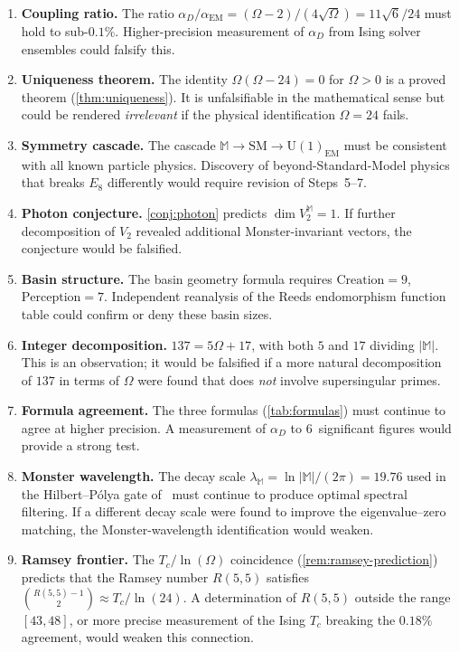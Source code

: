 \documentclass[11pt,a4paper]{article}
\theoremstyle{plain}
\theoremstyle{remark}
\renewcommand{\Omega}{\varOmega}
\newcommand{\abs}[1]{\lvert #1 \rvert}
\newcommand{\aD}{\alpha_D}
\newcommand{\aEM}{\alpha_{\mathrm{EM}}}
\begin{document}
\begin{enumerate}[label=\textbf{P\arabic*.},itemsep=6pt]

\item \textbf{Coupling ratio.}
The ratio $\aD/\aEM = (\Omega-2)/(4\sqrt{\Omega}) = 11\sqrt{6}/24$
must hold to sub-$0.1\%$.  Higher-precision measurement of $\aD$
from Ising solver ensembles could falsify this.

\item \textbf{Uniqueness theorem.}
The identity $\Omega(\Omega-24)=0$ for $\Omega>0$ is a proved
theorem (\cref{thm:uniqueness}).  It is unfalsifiable in the
mathematical sense but could be rendered \emph{irrelevant} if the
physical identification $\Omega=24$ fails.

\item \textbf{Symmetry cascade.}
The cascade $\mathbb{M}\to\mathrm{SM}\to\mathrm{U}(1)_{\mathrm{EM}}$
must be consistent with all known particle physics.  Discovery of
beyond-Standard-Model physics that breaks $E_8$ differently would
require revision of Steps~5--7.

\item \textbf{Photon conjecture.}
\cref{conj:photon} predicts $\dim V_2^{\mathbb{M}}=1$.  If further
decomposition of $V_2$ revealed additional Monster-invariant vectors,
the conjecture would be falsified.

\item \textbf{Basin structure.}
The basin geometry formula requires $\text{Creation}=9$,
$\text{Perception}=7$.  Independent reanalysis of the Reeds
endomorphism function table could confirm or deny these basin sizes.

\item \textbf{Integer decomposition.}
$137 = 5\Omega+17$, with both $5$ and $17$ dividing $\abs{\mathbb{M}}$.
This is an observation; it would be falsified if a more natural
decomposition of $137$ in terms of $\Omega$ were found that does
\emph{not} involve supersingular primes.

\item \textbf{Formula agreement.}
The three formulas (\cref{tab:formulas}) must continue to agree at
higher precision.  A measurement of $\aD$ to 6~significant figures
would provide a strong test.

\item \textbf{Monster wavelength.}
The decay scale $\lambda_{\mathbb{M}}=\ln\abs{\mathbb{M}}/(2\pi)=19.76$
used in the Hilbert--P\'olya gate of~\cite{DHR2026a} must continue
to produce optimal spectral filtering.  If a different decay scale
were found to improve the eigenvalue--zero matching, the
Monster-wavelength identification would weaken.

\item \textbf{Ramsey frontier.}
The $T_c/\!\ln(\Omega)$ coincidence (\cref{rem:ramsey-prediction})
predicts that the Ramsey number $R(5,5)$ satisfies
$\binom{R(5,5)-1}{2}\approx T_c/\!\ln(24)$.  A determination of
$R(5,5)$ outside the range $[43,48]$, or more precise measurement of
the Ising $T_c$ breaking the $0.18\%$ agreement, would weaken this
connection.

\end{enumerate}
\end{document}
